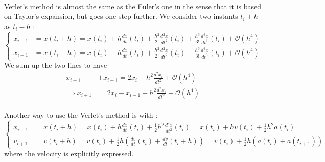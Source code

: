\documentclass[a4paper, twoside, 11pt]{report}
\theoremstyle{theorem}
\theoremstyle{remark}
\theoremstyle{exemple}
\begin{document}
            \paragraph{}Verlet's method is almost the same as the Euler's one in the sense that it is based on Taylor's expansion, but goes one step further. We consider two instants $t_i+h$ as $t_i-h$ :
                \begin{equation*}
                    \left\{ 
                        \begin{aligned}
                            x_{i+1} &= x(t_i+h) = x(t_i) + h\frac{dx}{dt}(t_i) + \frac{h^2}{2!}\frac{d^2x}{dt^2}(t_i) + \frac{h^3}{3!}\frac{d^3x}{dt^3}(t_i)+\mathcal{O}(h^4)\\
                            x_{i-1} &= x(t_i-h) = x(t_i) - h\frac{dx}{dt}(t_i) + \frac{h^2}{2!}\frac{d^2x}{dt^2}(t_i) - \frac{h^3}{3!}\frac{d^3x}{dt^3}(t_i)+\mathcal{O}(h^4)
                        \end{aligned}
                    \right.
                \end{equation*}
            We sum up the two lines to have
                \begin{align*}
                    x_{i+1} &+ x_{i-1} = 2x_i + h^2\frac{d^2x_i}{dt^2} + \mathcal{O}(h^4) \\
                    \Rightarrow x_{i+1} &= 2x_i - x_{i-1} + h^2\frac{d^2x_i}{dt^2} + \mathcal{O}(h^4)
                \end{align*}
            \paragraph{}Another way to use the Verlet's method is with :
                \begin{equation*}
                    \left\{
                        \begin{aligned}
                            x_{i+1}&=x(t_i+h) = x(t_i) + h\frac{dx}{dt}(t_i) + \frac{1}{2}h^2 \frac{d^2x}{dt^2}(t_i) =x(t_i) + hv(t_i) + \frac{1}{2}h^2 a(t_i) \\
                            v_{i+1}&=v(t_i+h) = v(t_i) + \frac{1}{2}h\left(\frac{dv}{dt}(t_i) + \frac{dv}{dt}(t_i+h)\right) =v(t_i) + \frac{1}{2}h\left(a(t_i) + a(t_{i+1})\right)
                        \end{aligned}
                    \right.
                \end{equation*}
            where the velocity is explicitly expressed.
            
\end{document}
